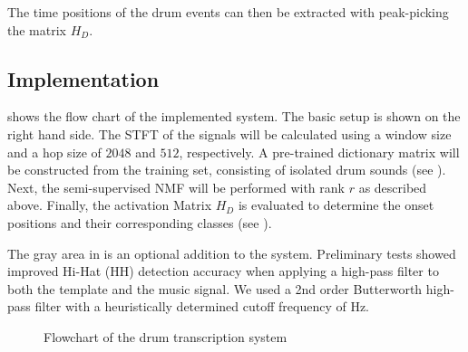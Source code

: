 \documentclass{article}
\begin{document}
The time positions of the drum events can then be extracted with peak-picking the matrix $H_D$.

\subsection{Implementation}\label{subsec:processing steps}

 shows the flow chart of the implemented system. The basic setup is shown on the right hand side. 
The STFT of the signals will be calculated using a window size and a hop size of $2048$ and $512$, respectively. 
A pre-trained dictionary matrix will be constructed from the training set, consisting of isolated drum sounds (see ). 
Next, the semi-supervised NMF will be performed with rank $r$ as described above. 
Finally, the activation Matrix $H_D$ is evaluated to determine the onset positions and their corresponding classes  (see ).  

The gray area in  is an optional addition to the system. Preliminary tests showed improved Hi-Hat (HH) detection accuracy when applying a high-pass filter to both the template and the music signal. We used a 2nd order Butterworth high-pass filter with a heuristically determined cutoff frequency of \unit[8000]{Hz}. %

\begin{figure}
 \centerline{}
 \caption{Flowchart of the drum transcription system} %
 \label{fig:flowchart}
\end{figure}
\end{document}
